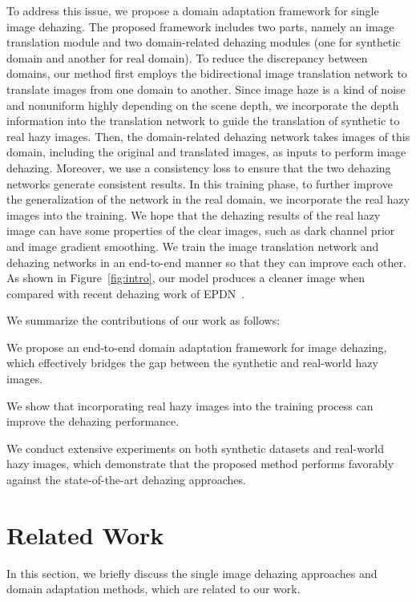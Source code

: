 \documentclass[10pt,twocolumn,letterpaper]{article}
\begin{document}
To address this issue, we propose a domain adaptation framework for single image dehazing.
The proposed framework includes two parts, namely an image translation module and two domain-related dehazing modules (one for synthetic domain and another for real domain).
To reduce the discrepancy between domains, our method first employs the bidirectional image translation network to translate images from one domain to another.
Since image haze is a kind of noise and nonuniform highly depending on the scene depth, we incorporate the depth information into the translation network to guide the translation of synthetic to real hazy images.
Then, the domain-related dehazing network takes images of this domain, including the original and translated images, as inputs to perform image dehazing.
Moreover, we use a consistency loss to ensure that the two dehazing networks generate consistent results. 
In this training phase, to further improve the generalization of the network in the real domain, we incorporate the real hazy images into the training.
We hope that the dehazing results of the real hazy image can have some properties of the clear images, such as dark channel prior and image gradient smoothing.
We train the image translation network and dehazing networks in an end-to-end manner so that they can improve each other.
As shown in Figure~\ref{fig:intro}, our model produces a cleaner image when compared with recent dehazing work of EPDN~\cite{qu2019enhanced}.

We summarize the contributions of our work as follows:
\vspace{-3mm}
\begin{compactitem}
\item We propose an end-to-end domain adaptation framework for image dehazing, which effectively bridges the gap between the synthetic and real-world hazy images.
\item We show that incorporating real hazy images into the training process can improve the dehazing performance. 
\item We conduct extensive experiments on both synthetic datasets and real-world hazy images, which demonstrate that the proposed method performs favorably against the state-of-the-art dehazing approaches.
\end{compactitem}
\section{Related Work}
In this section, we briefly discuss the single image dehazing approaches and domain adaptation methods, which are related to our work.
\end{document}
